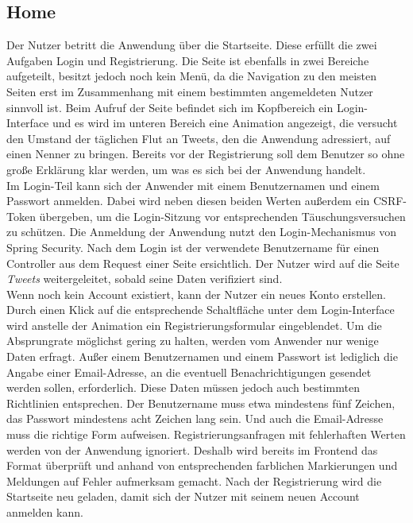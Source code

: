 \subsection{Home}
Der Nutzer betritt die Anwendung über die Startseite. Diese erfüllt die zwei Aufgaben Login und Registrierung. Die Seite ist ebenfalls in zwei Bereiche aufgeteilt, besitzt jedoch noch kein Menü, da die Navigation zu den meisten Seiten erst im Zusammenhang mit einem bestimmten angemeldeten Nutzer sinnvoll ist. Beim Aufruf der Seite befindet sich im Kopfbereich ein Login-Interface und es wird im unteren Bereich eine Animation angezeigt, die versucht den Umstand der täglichen Flut an Tweets, den die Anwendung adressiert, auf einen Nenner zu bringen. Bereits vor der Registrierung soll dem Benutzer so ohne große Erklärung klar werden, um was es sich bei der Anwendung handelt. \\
Im Login-Teil kann sich der Anwender mit einem Benutzernamen und einem Passwort anmelden. Dabei wird neben diesen beiden Werten außerdem ein CSRF-Token übergeben, um die Login-Sitzung vor entsprechenden Täuschungsversuchen zu schützen. Die Anmeldung der Anwendung nutzt den Login-Mechanismus von Spring Security. Nach dem Login ist der verwendete Benutzername für einen Controller aus dem Request einer Seite ersichtlich. Der Nutzer wird auf die Seite \textit{Tweets} weitergeleitet, sobald seine Daten verifiziert sind. \\
Wenn noch kein Account existiert, kann der Nutzer ein neues Konto erstellen. Durch einen Klick auf die entsprechende Schaltfläche unter dem Login-Interface wird anstelle der Animation ein Registrierungsformular eingeblendet. Um die Absprungrate möglichst gering zu halten, werden vom Anwender nur wenige Daten erfragt. Außer einem Benutzernamen und einem Passwort ist lediglich die Angabe einer Email-Adresse, an die eventuell Benachrichtigungen gesendet werden sollen, erforderlich. Diese Daten müssen jedoch auch bestimmten Richtlinien entsprechen. Der Benutzername muss etwa mindestens fünf Zeichen, das Passwort mindestens acht Zeichen lang sein. Und auch die Email-Adresse muss die richtige Form aufweisen. Registrierungsanfragen mit fehlerhaften Werten werden von der Anwendung ignoriert. Deshalb wird bereits im Frontend das Format überprüft und anhand von entsprechenden farblichen Markierungen und Meldungen  auf Fehler aufmerksam gemacht. Nach der Registrierung wird die Startseite neu geladen, damit sich der Nutzer mit seinem neuen Account anmelden kann.
%
